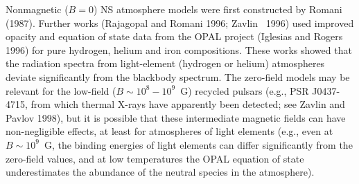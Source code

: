 Nonmagnetic ($B=0$) NS atmosphere models were first constructed by 
Romani (1987). Further works 
(Rajagopal and Romani 1996; Zavlin \etal~1996) used improved opacity and 
equation of state data from the OPAL project (Iglesias and Rogers 1996) for 
pure hydrogen, helium and iron compositions. 
These works showed that the radiation spectra from light-element (hydrogen or 
helium) atmospheres deviate significantly from the blackbody spectrum.
The zero-field models may be relevant for the low-field
($B\sim 10^8-10^9$~G) recycled pulsars (e.g., PSR J0437-4715, from which
thermal X-rays have apparently been detected; see Zavlin and Pavlov 1998), 
but it is possible that these intermediate magnetic fields
can have non-negligible effects, at least for atmospheres
of light elements (e.g., even at $B\sim 10^9$~G, the binding energies
of light elements can differ significantly from the zero-field values, 
and at low temperatures the OPAL equation of state 
underestimates the abundance of the neutral species in the atmosphere).

